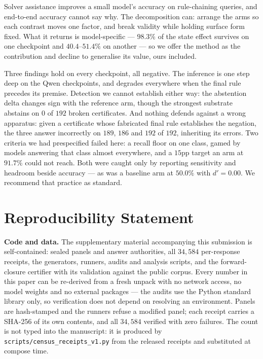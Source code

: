 \documentclass[10pt,twocolumn]{article}
\begin{document}
Solver assistance improves a small model's accuracy on rule-chaining queries, and
end-to-end accuracy cannot say why. The decomposition can: arrange the arms so each
contrast moves one factor, and break validity while holding surface form fixed.
What it returns is model-specific --- $98.3\%$ of the state effect survives on one
checkpoint and $40.4$--$51.4\%$ on another --- so we offer the method as the
contribution and decline to generalise its value, ours included.

Three findings hold on every checkpoint, all negative. The inference is one step
deep on the Qwen checkpoints, and degrades everywhere when the final rule
precedes its premise. Detection we cannot establish either way: the abstention
delta changes sign with the reference arm, though the strongest substrate abstains
on $0$ of $192$ broken certificates. And nothing defends against a wrong apparatus: given a certificate whose
fabricated final rule establishes the negation, the three answer incorrectly on
$189$, $186$ and $192$ of $192$, inheriting its errors. Two criteria we had prespecified failed here: a recall floor on one class, gamed
by models answering that class almost everywhere, and a $15$pp target an arm at
$91.7\%$ could not reach. Both were caught only by reporting sensitivity and
headroom beside accuracy --- as was a baseline arm at $50.0\%$ with $d' = 0.00$.
We recommend that practice as standard.

\section*{Reproducibility Statement}

\textbf{Code and data.} The supplementary material accompanying this submission
is self-contained: sealed panels and answer authorities, all $34{,}584$
per-response receipts, the generators, runners, audits and analysis scripts, and
the forward-closure certifier with its validation against the public corpus.
Every number in this paper can be re-derived from a fresh unpack with no network
access, no model weights and no external packages --- the audits use the Python
standard library only, so verification does not depend on resolving an
environment. Panels are hash-stamped and the runners refuse a modified panel;
each receipt carries a SHA-256 of its own contents, and all $34{,}584$
verified with zero failures. The count is not typed into the manuscript: it is
produced by \texttt{scripts/census\_receipts\_v1.py} from the released receipts
and substituted at compose time.
\end{document}
